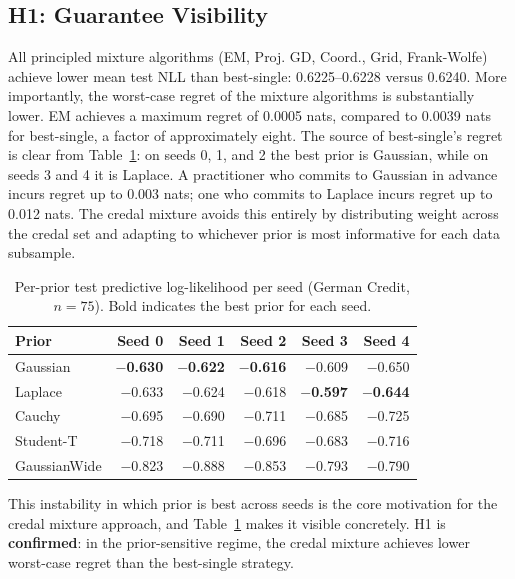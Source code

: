 \subsection{H1: Guarantee Visibility}
\label{sec:h1}

All principled mixture algorithms (EM, 
Proj. GD, Coord., Grid, Frank-Wolfe) 
achieve lower mean test NLL than 
best-single: 0.6225--0.6228 versus 
0.6240. More importantly, the worst-case 
regret of the mixture algorithms is 
substantially lower. EM achieves a maximum 
regret of 0.0005 nats, compared to 0.0039 
nats for best-single, a factor of 
approximately eight. The source of 
best-single's regret is clear from 
Table~\ref{tab:prior_per_seed}: on seeds 
0, 1, and 2 the best prior is Gaussian, 
while on seeds 3 and 4 it is Laplace. A 
practitioner who commits to Gaussian in 
advance incurs regret up to 0.003 nats; 
one who commits to Laplace incurs regret 
up to 0.012 nats. The credal mixture 
avoids this entirely by distributing 
weight across the credal set and 
adapting to whichever prior is most 
informative for each data subsample.

\begin{table}[h]
\centering
\caption{Per-prior test predictive 
log-likelihood per seed (German Credit, 
$n = 75$). Bold indicates the best prior 
for each seed.}
\label{tab:prior_per_seed}
{\singlespacing
\begin{tabular}{lrrrrr}
\hline
Prior & Seed 0 & Seed 1 & Seed 2 
& Seed 3 & Seed 4 \\
\hline
Gaussian      & \textbf{$-$0.630} 
              & \textbf{$-$0.622} 
              & \textbf{$-$0.616} 
              & $-$0.609 & $-$0.650 \\
Laplace       & $-$0.633 & $-$0.624 
              & $-$0.618 
              & \textbf{$-$0.597} 
              & \textbf{$-$0.644} \\
Cauchy        & $-$0.695 & $-$0.690 
              & $-$0.711 & $-$0.685 
              & $-$0.725 \\
Student-T     & $-$0.718 & $-$0.711 
              & $-$0.696 & $-$0.683 
              & $-$0.716 \\
GaussianWide  & $-$0.823 & $-$0.888 
              & $-$0.853 & $-$0.793 
              & $-$0.790 \\
\hline
\end{tabular}}
\end{table}

This instability in which prior is 
best across seeds is the core motivation 
for the credal mixture approach, and 
Table~\ref{tab:prior_per_seed} makes 
it visible concretely. H1 is 
\textbf{confirmed}: in the 
prior-sensitive regime, the credal 
mixture achieves lower worst-case 
regret than the best-single 
strategy.

